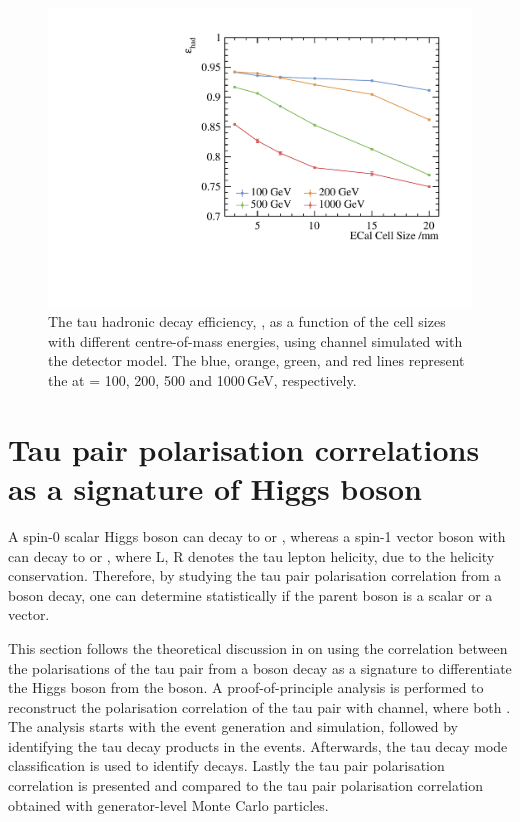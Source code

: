 \begin{figure}[htbp]
\centering %
\includegraphics[width=.85\textwidth]{tau/plots3/hadronicEff.pdf}
\caption[The tau hadronic decay efficiency as a function of  the \ECAL cell sizes at different \sqrtS with the \ILD detector model.]
{The tau hadronic decay efficiency, \tauHad, as a function of  the \ECAL cell sizes with different centre-of-mass energies, using \eeTauTau channel simulated with the \ILD detector model. The blue, orange, green, and red lines  represent the \tauHad at \sqrtS = 100, 200, 500 and 1000\,GeV, respectively.}
\label{fig:TauHadronicEfficiency}
\end{figure}


\section{Tau pair polarisation correlations as a signature of Higgs boson}
\label{sec:tauHZ}



A  spin-0 scalar Higgs boson can decay to  or , whereas  a   spin-1 vector boson \PZ with can decay to  or , where L, R denotes the tau lepton helicity, due to the helicity conservation. Therefore, by studying the tau pair polarisation correlation from a boson decay, one can determine statistically if the parent boson is a  scalar or a vector.

This section follows the theoretical discussion in  on using the correlation between the polarisations of the tau pair from a boson decay as a signature to differentiate the Higgs boson from the \PZ boson. A proof-of-principle analysis  is performed to reconstruct the polarisation correlation of the tau pair with \ZToTauTau channel, where both \tauToPion. The analysis starts with the event generation and simulation, followed by identifying the tau decay products in the events. Afterwards, the tau decay mode classification is used to identify \tauToPion decays. Lastly the tau pair polarisation correlation is presented and compared to  the tau pair polarisation correlation obtained with generator-level Monte Carlo particles.


